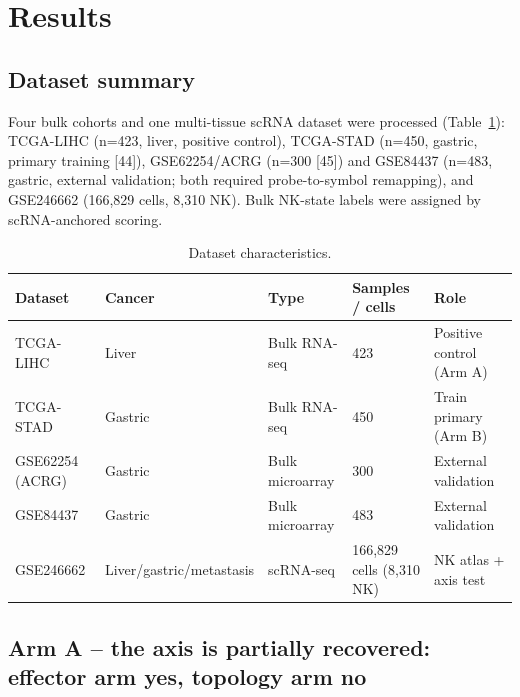 \documentclass[modern,large,numbered,nocrop]{oup-authoring-template}
\begin{document}
\section{Results}

\subsection{Dataset summary}

Four bulk cohorts and one multi-tissue scRNA dataset were processed (Table~\ref{tab:datasets}): TCGA-LIHC (n=423, liver, positive control), TCGA-STAD (n=450, gastric, primary training [44]), GSE62254/ACRG (n=300 [45]) and GSE84437 (n=483, gastric, external validation; both required probe-to-symbol remapping), and GSE246662 (166,829 cells, 8,310 NK). Bulk NK-state labels were assigned by scRNA-anchored scoring.

\begin{table}[htbp]
\caption{Dataset characteristics.}\label{tab:datasets}
\footnotesize
\begin{tabularx}{\textwidth}{@{}lXXXX@{}}
\toprule
Dataset & Cancer & Type & Samples / cells & Role \\
\midrule
TCGA-LIHC & Liver & Bulk RNA-seq & 423 & Positive control (Arm A) \\
TCGA-STAD & Gastric & Bulk RNA-seq & 450 & Train primary (Arm B) \\
GSE62254 (ACRG) & Gastric & Bulk microarray & 300 & External validation \\
GSE84437 & Gastric & Bulk microarray & 483 & External validation \\
GSE246662 & Liver/gastric/metastasis & scRNA-seq & 166,829 cells (8,310 NK) & NK atlas + axis test \\
\bottomrule
\end{tabularx}
\end{table}

\subsection{Arm A -- the axis is partially recovered: effector arm yes, topology arm no}
\end{document}
